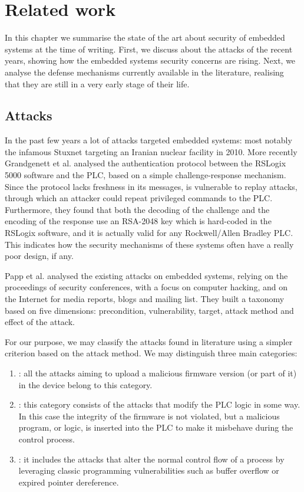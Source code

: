 \chapter{Related work}
\label{chap:related}

In this chapter we summarise the state of the art about security of embedded systems at the time of writing.
First, we discuss about the attacks of the recent years, showing how the embedded systems security concerns are rising.
Next, we analyse the defense mechanisms currently available in the literature, realising that they are still in a very early stage of their life.

\section{Attacks}

In the past few years a lot of attacks targeted embedded systems: most notably the infamous Stuxnet \cite{stuxnet} targeting an Iranian nuclear facility in 2010.
More recently Grandgenett et al. \cite{io-command} analysed the authentication protocol between the RSLogix 5000 software and the PLC, based on a simple challenge-response mechanism.
Since the protocol lacks freshness in its messages, is vulnerable to replay attacks, through which an attacker could repeat privileged commands to the PLC.
Furthermore, they found that both the decoding of the challenge and the encoding of the response use an RSA-2048 key which is hard-coded in the RSLogix software,
and it is actually valid for any Rockwell/Allen Bradley PLC.
This indicates how the security mechanisms of these systems often have a really poor design, if any.

Papp et al. \cite{taxonomy} analysed the existing attacks on embedded systems, relying on the proceedings of security conferences, with a focus on computer hacking,
and on the Internet for media reports, blogs and mailing list. They built a taxonomy based on five dimensions: precondition, vulnerability, target, attack method and effect of the attack.

For our purpose, we may classify the attacks found in literature using a simpler criterion based on the attack method. We may distinguish three main categories:
\begin{enumerate}
	\item {}: all the attacks aiming to upload a malicious firmware version (or part of it) in the device belong to this category.
	\item {}: this category consists of the attacks that modify the PLC logic in some way. In this case the integrity of the firmware is not violated,
		but a malicious program, or logic, is inserted into the PLC to make it misbehave during the control process.
	\item {}: it includes the attacks that alter the normal control flow of a process by leveraging classic programming vulnerabilities
		such as buffer overflow or expired pointer dereference.
\end{enumerate}

